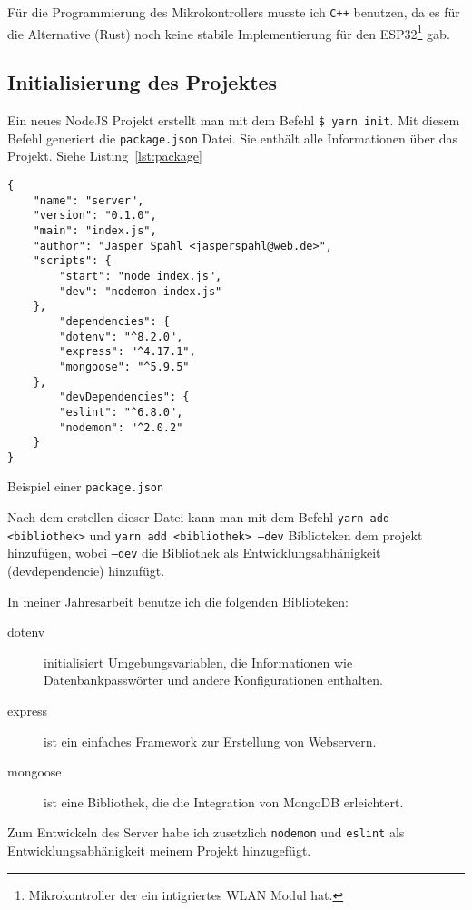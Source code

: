 \documentclass[a4paper, ngerman, 11pt]{scrartcl}
\begin{document}
Für die Programmierung des Mikrokontrollers musste ich \texttt{C++} benutzen, da es für die Alternative (Rust)
noch keine stabile Implementierung für den ESP32\footnote{Mikrokontroller der ein intigriertes WLAN Modul hat.} gab.

\subsection{Initialisierung des Projektes} %

Ein neues NodeJS Projekt erstellt man mit dem Befehl \texttt{\$ yarn init}.
Mit diesem Befehl generiert die \texttt{package.json} Datei.
Sie enthält alle Informationen über das Projekt. Siehe Listing~\ref{lst:package}


\begin{listing}[ht]
\centering
\begin{verbatim}
{
    "name": "server",
    "version": "0.1.0",
    "main": "index.js",
    "author": "Jasper Spahl <jasperspahl@web.de>",
    "scripts": {
        "start": "node index.js",
        "dev": "nodemon index.js"
    },
        "dependencies": {
        "dotenv": "^8.2.0",
        "express": "^4.17.1",
        "mongoose": "^5.9.5"
    },
        "devDependencies": {
        "eslint": "^6.8.0",
        "nodemon": "^2.0.2"
    }
}
\end{verbatim}
\caption{Beispiel einer \texttt{package.json}\label{lst:package}}
\end{listing}

Nach dem erstellen dieser Datei kann man mit dem Befehl \texttt{yarn add <bibliothek>} und \texttt{yarn add <bibliothek> --dev} Biblioteken dem projekt hinzufügen, wobei \texttt{--dev} die Bibliothek als Entwicklungsabhänigkeit (devdependencie) hinzufügt.

In meiner Jahresarbeit benutze ich die folgenden Biblioteken:

\begin{description}
	\item[dotenv] initialisiert Umgebungsvariablen, die Informationen wie Datenbankpasswörter und andere Konfigurationen enthalten.
	\item[express] ist ein einfaches Framework zur Erstellung von Webservern.
	\item[mongoose] ist eine Bibliothek, die die Integration von MongoDB erleichtert.
\end{description}

Zum Entwickeln des Server habe ich zusetzlich \texttt{nodemon} und \texttt{eslint} als Entwicklungsabhänigkeit meinem Projekt hinzugefügt.
\end{document}

